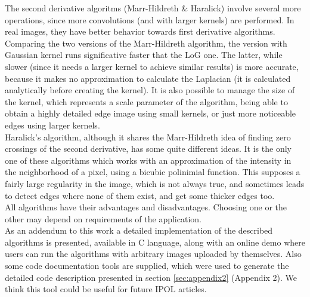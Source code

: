 \documentclass{ipol}
\numberwithin{equation}{section}
\numberwithin{table}{section}
\numberwithin{figure}{section}
\begin{document}
The second derivative algoritms (Marr-Hildreth \& Haralick) involve several more operations, since more convolutions (and with larger kernels) are performed. In real images, they have better behavior towards first derivative algorithms. \\

Comparing the two versions of the Marr-Hildreth algorithm, the version with Gaussian kernel runs significative faster that the LoG one. The latter, while slower (since it needs a larger kernel to achieve similar results) is more accurate, because it makes no approximation to calculate the Laplacian (it is calculated analytically before creating the kernel). It is also possible to manage the size of the kernel, which represents a scale parameter of the algorithm, being able to obtain a highly detailed edge image using small kernels, or just more noticeable edges using larger kernels. \\

Haralick's algorithm, although it shares the Marr-Hildreth idea of finding zero crossings of the second derivative, has some quite different ideas. It is the only one of these algorithms which works with an approximation of the intensity in the neighborhood of a pixel, using a bicubic polinimial function. This supposes a fairly large regularity in the image, which is not always true, and sometimes leads to detect edges where none of them exist, and get some thicker edges too. \\

All algorithms have their advantages and disadvantages. Choosing one or the other may depend on requirements of the application. \\ 


As an addendum to this work a detailed implementation of the described algorithms is presented, 
available in C language, along with an online demo where users can run the algorithms 
with arbitrary images uploaded by themselves. Also some code documentation tools are supplied, 
which were used to generate the detailed code description presented in section \ref{sec:appendix2} (Appendix 2). We think this tool could be useful for future IPOL articles. 

\clearpage




\end{document}
